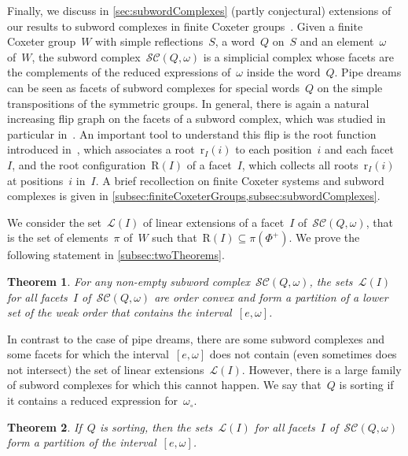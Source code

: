 \documentclass[reqno]{amsart}
\newtheorem{theoremA}{Theorem}
\theoremstyle{definition}
\newcommand{\linearExtensions}{\mathcal{L}} %
\newcommand{\wo}{\omega_\circ} %
\newcommand{\subwordComplex}{\mathcal{SC}} %
\newcommand{\Roots}{\mathrm{R}} %
\newcommand{\rootFunction}[2]{\mathrm{r}_{#1}(#2)} %
\begin{document}
Finally, we discuss in \cref{sec:subwordComplexes} (partly conjectural) extensions of our results to subword complexes in finite Coxeter groups~\cite{KnutsonMiller-subwordComplex}.
Given a finite Coxeter group~$W$ with simple reflections~$S$, a word~$Q$ on~$S$ and an element~$\omega$ of~$W$, the subword complex~$\subwordComplex(Q,\omega)$ is a simplicial complex whose facets are the complements of the reduced expressions of~$\omega$ inside the word~$Q$.
Pipe dreams can be seen as facets of subword complexes for special words~$Q$ on the simple transpositions of the symmetric groups.
In general, there is again a natural increasing flip graph on the facets of a subword complex, which was studied in particular in~\cite{PilaudStump-ELlabelings}.
An important tool to understand this flip is the root function introduced in~\cite{CeballosLabbeStump}, which associates a root~$\rootFunction{I}{i}$ to each position~$i$ and each facet~$I$, and the root configuration~$\Roots(I)$ of a facet~$I$, which collects all roots~$\rootFunction{I}{i}$ at positions~$i$ in~$I$.
A brief recollection on finite Coxeter systems and subword complexes is given in \cref{subsec:finiteCoxeterGroups,subsec:subwordComplexes}.

We consider the set~$\linearExtensions(I)$ of linear extensions of a facet~$I$ of~$\subwordComplex(Q,\omega)$, that is the set of elements~$\pi$ of~$W$ such that~${\Roots(I) \subseteq \pi(\Phi^+)}$.
We prove the following statement in \cref{subsec:twoTheorems}.

\begin{theoremA}
\label{thm:B}
For any non-empty subword complex~$\subwordComplex(Q, \omega)$, the sets~$\linearExtensions(I)$ for all facets~$I$ of~$\subwordComplex(Q, \omega)$ are order convex and form a partition of a lower set of the weak order that contains the interval~$[e, \omega]$.
\end{theoremA}

In contrast to the case of pipe dreams, there are some subword complexes and some facets for which the interval~$[e, \omega]$ does not contain (even sometimes does not intersect) the set of linear extensions~$\linearExtensions(I)$.
However, there is a large family of subword complexes for which this cannot happen.
We say that~$Q$ is sorting if it contains a reduced expression for~$\wo$.

\begin{theoremA}
\label{thm:C}
If~$Q$ is sorting, then the sets~$\linearExtensions(I)$ for all facets~$I$ of~$\subwordComplex(Q, \omega)$ form a partition of the interval~$[e, \omega]$.
\end{theoremA}
\end{document}

